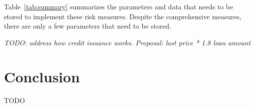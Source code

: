 \documentclass[english,11pt]{article}
\begin{document}
Table~\ref{tab:summary} summarizes the parameters and data that needs to be
stored to implement these risk measures. Despite the comprehensive
measures, there are only a few parameters that need to be stored.

\emph{TODO: address how credit issuance works. Proposal: last price * 1.8 loan amount}
\clearpage
\section{Conclusion}
TODO

\newpage


\end{document}
